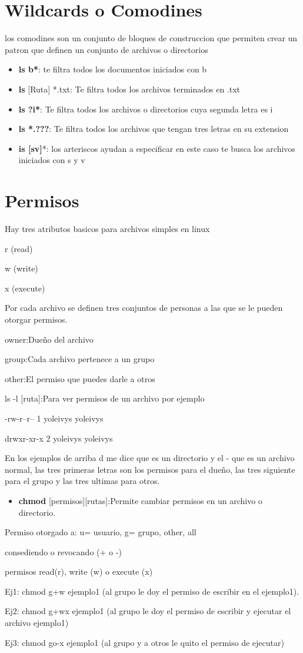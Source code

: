 \documentclass[12pt,a4paper]{article}
\begin{document}
\section{Wildcards o Comodines}

los comodines son un conjunto de bloques de construccion que permiten crear un patron que definen un conjunto de archivos o directorios
\begin{itemize}
\item \textbf{ls b*}: te filtra todos los documentos iniciados con b
\item \textbf{ls }[Ruta] *.txt: Te filtra todos los archivos terminados en .txt
\item \textbf{ls ?i*}: Te filtra todos los archivos o directorios cuya segunda letra es i
\item \textbf{ls *.???}: Te filtra todos los archivos que tengan tres letras en su extension
\item \textbf{is [sv]}*: los arteriscos ayudan a especificar en este caso te busca los archivos iniciados con s y v
\end{itemize}

\section{Permisos}

Hay tres atributos basicos para archivos simples en linux 

r (read)

w (write)

x (execute)


Por cada archivo se definen tres conjuntos de personas a las que se le pueden otorgar permisos.


owner:Dueño del archivo

group:Cada archivo pertenece a un grupo

other:El permiso que puedes darle a otros
 
ls -l [ruta]:Para ver permisos de un archivo por ejemplo


-rw-r--r-- 1 yoleivys yoleivys

drwxr-xr-x 2 yoleivys yoleivys


En los ejemplos de arriba d me dice que es un directorio y el - que es un archivo normal, las tres primeras letras son los permisos para el dueño, las tres siguiente para el grupo y las tres ultimas para otros.

\begin{itemize}

\item \textbf{chmod} [permisos][rutas]:Permite cambiar permisos en un archivo o directorio.
\end{itemize}
Permiso otorgado a: u= usuario, g= grupo, other, all

consediendo o revocando (+ o -)

permisos read(r), write (w) o execute (x)


Ej1: chmod g+w ejemplo1 (al grupo le doy el permiso de escribir en el ejemplo1).

Ej2: chmod g+wx ejemplo1 (al grupo le doy el permiso de escribir y ejecutar el archivo ejemplo1)

Ej3: chmod go-x ejemplo1 (al grupo y a otros le quito el permiso de ejecutar)
\end{document}

